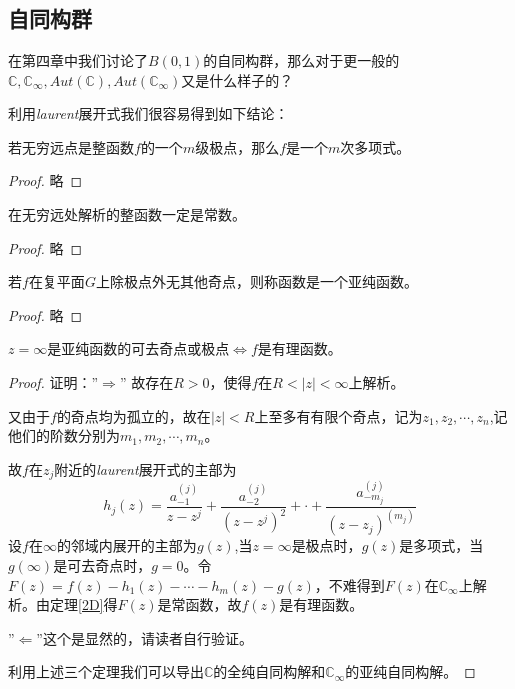 \chapter{}



\section{自同构群\uppercase\expandafter{}}   
在第四章中我们讨论了$B(0,1)$的自同构群，那么对于更一般的$ \mathbb{C}, \mathbb{C}_{\infty} , Aut(\mathbb{C}),Aut( \mathbb{C}_{\infty} )$又是什么样子的？\par
    利用\emph{laurent}展开式我们很容易得到如下结论：
    \begin{theorem}\label{1D}
        若无穷远点是整函数$f$的一个$m$级极点，那么$f$是一个$m$次多项式。
    \end{theorem}
    \begin{proof}
    略
 	\end{proof}
    \begin{theorem}\label{2D}
        在无穷远处解析的整函数一定是常数。
    \end{theorem}
    \begin{proof}
    略
 	\end{proof}
    \begin{theorem}\label{3D}
        若$f$在复平面$G$上除极点外无其他奇点，则称函数是一个亚纯函数。
    \end{theorem}
    \begin{proof}
    略
 	\end{proof}
    \begin{theorem}\label{4D}
        $z=\infty$是亚纯函数的可去奇点或极点$\Leftrightarrow f$是有理函数。
    \end{theorem}
    \begin{proof}
    证明：''$\Rightarrow$'' 故存在$R > 0$，使得$f$在$R < \left |z \right |  < \infty$上解析。\par
    又由于$f$的奇点均为孤立的，故在$\left |z \right | <R$上至多有有限个奇点，记为$ z_1,z_2,\cdots,z_n$,记他们的阶数分别为$m_1,m_2,\cdots,m_n$。\par
    故$f$在$z_j$附近的\emph{laurent}展开式的主部为
    \begin{equation*}
    h_j(z)=\frac{a^{(j)}_{-1}}{z-z^j}+\frac{a^{(j)}_{-2}}{(z-z^j)^2}+\cdot+\frac{a^{(j)}_{-m_j}}{(z-z_j)^(m_j)}
    \end{equation*}
    设$f$在$\infty$的邻域内展开的主部为$g \left(z \right)$,当$z = \infty $是极点时，$g \left(z \right)$是多项式，当$g \left(\infty \right)$是可去奇点时，$g = 0$。令$ F \left(z \right)=f\left(z \right)-h_1\left(z \right)-\cdots-h_m\left(z \right)-g\left(z \right)$，不难得到$ F \left(z \right)$在$\mathbb{C}_{\infty}$上解析。由定理\ref{2D}得$ F \left(z \right)$是常函数，故$ f \left(z \right)$是有理函数。\par
''$\Leftarrow$''这个是显然的，请读者自行验证。\par
利用上述三个定理我们可以导出$ \mathbb{C}$的全纯自同构解和$\mathbb{C}_{\infty}$的亚纯自同构解。
 \end{proof}
